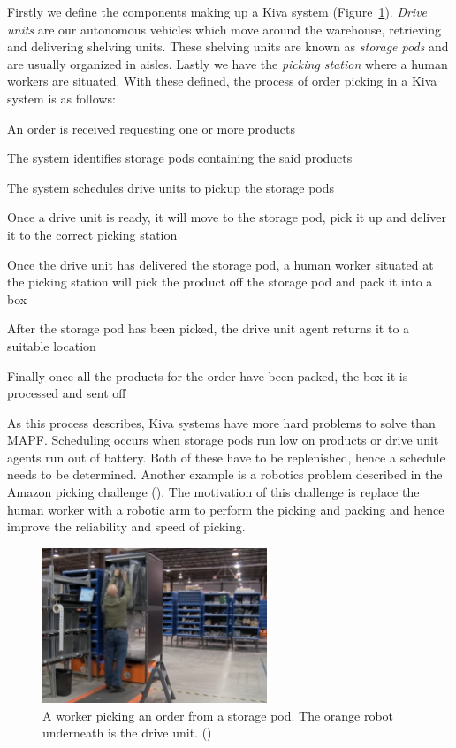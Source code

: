 \documentclass[a4paper,11pt]{article}
\begin{document}
Firstly we define the components making up a Kiva system (Figure~\ref{fig:kivaprocess}). \textit{Drive units} are our autonomous vehicles which move around the warehouse, retrieving and delivering shelving units. These shelving units are known as \textit{storage pods} and are usually organized in aisles. Lastly we have the \textit{picking station} where a human workers are situated. With these defined, the process of order picking in a Kiva system is as follows:
\begin{compactenum}
	\item An order is received requesting one or more products
	\item The system identifies storage pods containing the said products
	\item The system schedules drive units to pickup the storage pods
	\item Once a drive unit is ready, it will move to the storage pod, pick it up and deliver it to the correct picking station
	\item Once the drive unit has delivered the storage pod, a human worker situated at the picking station will pick the product off the storage pod and pack it into a box
	\item After the storage pod has been picked, the drive unit agent returns it to a suitable location
	\item Finally once all the products for the order have been packed, the box it is processed and sent off
\end{compactenum}

\noindent As this process describes, Kiva systems have more hard problems to solve than MAPF. Scheduling occurs when storage pods run low on products or drive unit agents run out of battery. Both of these have to be replenished, hence a schedule needs to be determined. Another example is a robotics problem described in the Amazon picking challenge (\cite{correll2016lessons}). The motivation of this challenge is replace the human worker with a robotic arm to perform the picking and packing and hence improve the reliability and speed of picking. 

\begin{figure}[h!]
	\centering
	\includegraphics[width=0.6\textwidth ]{graphics/kivaprocess}
	\caption{A worker picking an order from a storage pod. The orange robot underneath is the drive unit. (\cite{kivayoutube2010quietlogistics})}
	\label{fig:kivaprocess}
\end{figure}
\end{document}
